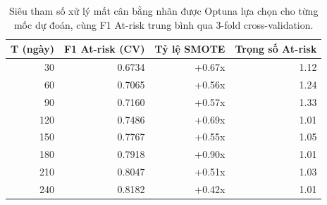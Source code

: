 \begin{table}[H]
  \centering
  \caption{Siêu tham số xử lý mất cân bằng nhãn được Optuna lựa chọn cho từng mốc dự đoán, cùng F1 At-risk trung bình qua 3-fold cross-validation.}
  \label{tab:snapshot_params}
  \begin{tabular}{rrrr}
    \toprule
    \textbf{T (ngày)} & \textbf{F1 At-risk (CV)} & \textbf{Tỷ lệ SMOTE} & \textbf{Trọng số At-risk} \\
    \midrule
    30 & 0.6734 & +0.67x & 1.12 \\
    60 & 0.7065 & +0.56x & 1.24 \\
    90 & 0.7160 & +0.57x & 1.33 \\
    120 & 0.7486 & +0.69x & 1.01 \\
    150 & 0.7767 & +0.55x & 1.05 \\
    180 & 0.7918 & +0.90x & 1.01 \\
    210 & 0.8047 & +0.51x & 1.03 \\
    240 & 0.8182 & +0.42x & 1.01 \\
    \bottomrule
  \end{tabular}
\end{table}
